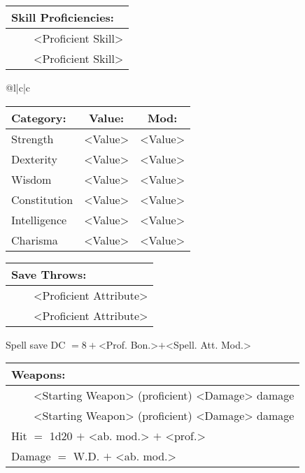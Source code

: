 \documentclass[11pt]{article}
\newcommand{\tabitem}{~~\llap{--}~~}
\begin{document}
\begin{multicols}{2}
\vspace{2mm}

\noindent \begin{tabularx}{\linewidth}{@{}l}
{\Large \textbf{Skill Proficiencies:}} \\
\hline
\tabitem <Proficient Skill> \\
\tabitem <Proficient Skill>
		\end{tabularx}

\vspace{4mm}

\noindent \begin{tabularx}{\linewidth}{@{}l|c|c}
 \\
\hline
		\end{tabularx}
\noindent \begin{tabular}{@{}l|c|c}
\textbf{Category:} 			& \textbf{Value:} 	& \textbf{Mod:} \\
\hline
Strength 					& <Value> 				& <Value>		\\
Dexterity 					& <Value> 				& <Value>		\\
Wisdom 						& <Value>				& <Value>		\\
Constitution 				& <Value> 				& <Value>		\\
Intelligence 				& <Value> 				& <Value>		\\
Charisma 					& <Value> 				& <Value>
		\end{tabular}

\vspace{4mm}

\noindent \begin{tabularx}{\linewidth}{@{}l}
{\Large \textbf{Save Throws:}} \\
\hline
\tabitem <Proficient Attribute> \\
\tabitem <Proficient Attribute> \\
		\end{tabularx}
\noindent Spell save DC $= 8 +$<Prof. Bon.>$+$<Spell. Att. Mod.>

\vspace{4mm}

\noindent \begin{tabularx}{\linewidth}{@{}l}
{\Large \textbf{Weapons:}} \\
\hline
\tabitem <Starting Weapon> (proficient) <Damage> damage \\
\tabitem <Starting Weapon> (proficient) <Damage> damage \\
Hit $=$ 1d20 $+$ <ab. mod.> $+$ <prof.> \\
Damage $=$ W.D. $+$ <ab. mod.>
		\end{tabularx}


\end{multicols}
\end{document}

